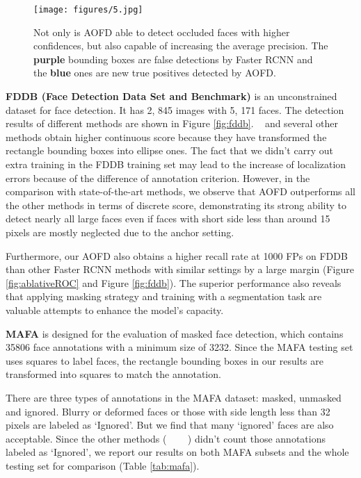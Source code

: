 \documentclass[10pt,twocolumn,letterpaper]{article}
\begin{document}
\begin{figure}[t]
	\begin{center}
		\texttt{[image: figures/5.jpg]}
	\end{center}
	\vspace{-6pt}
	\caption{Not only is AOFD able to detect occluded faces with higher confidences, but also capable of increasing the average precision. The {\bf purple} bounding boxes are false detections by  Faster RCNN and the {\bf blue} ones are new true positives detected by AOFD.}
	\vspace{-10pt}
	\label{fig:lift}
\end{figure}


\textbf{FDDB (Face Detection Data Set and Benchmark)} is an unconstrained dataset for face detection. It has 2, 845 images with 5, 171 faces. The detection results of different methods are shown in Figure \ref{fig:fddb}. 
~\cite{liu2017recurrent} and several other methods obtain higher continuous score because they have transformed the rectangle bounding boxes into ellipse ones. 
The fact that we didn't carry out extra training in the FDDB training set may lead to the increase of localization errors because of the difference of annotation criterion. However, in the comparison with state-of-the-art methods, we observe that AOFD outperforms all the other methods in terms of discrete score, demonstrating its strong ability to detect nearly all large faces even if faces with short side less than around 15 pixels are mostly neglected due to the anchor setting. 

Furthermore, our AOFD also obtains a higher recall rate at 1000 FPs on FDDB than other Faster RCNN methods with similar settings by a large margin (Figure \ref{fig:ablativeROC} and Figure \ref{fig:fddb}). 
The superior performance also reveals that applying masking strategy and training with a segmentation task are valuable attempts to enhance the model's capacity.





\textbf{MAFA} is designed for the evaluation of masked face detection, which contains 35806 face annotations with a minimum size of 3232. Since the MAFA testing set uses squares to label faces, the rectangle bounding boxes in our results are transformed into squares to match the annotation.



There are three types of annotations in the MAFA dataset: masked, unmasked and ignored. Blurry or deformed faces or those with side length less than 32 pixels are labeled as `Ignored'. But we find that many `ignored' faces are also acceptable. 
Since the other methods (~\cite{wang2017fan} ~\cite{ge2017detecting} ~\cite{zhang2016joint}) didn't count those annotations labeled as `Ignored', we report our results on both MAFA subsets and the whole testing set for comparison (Table \ref{tab:mafa}).
\end{document}
